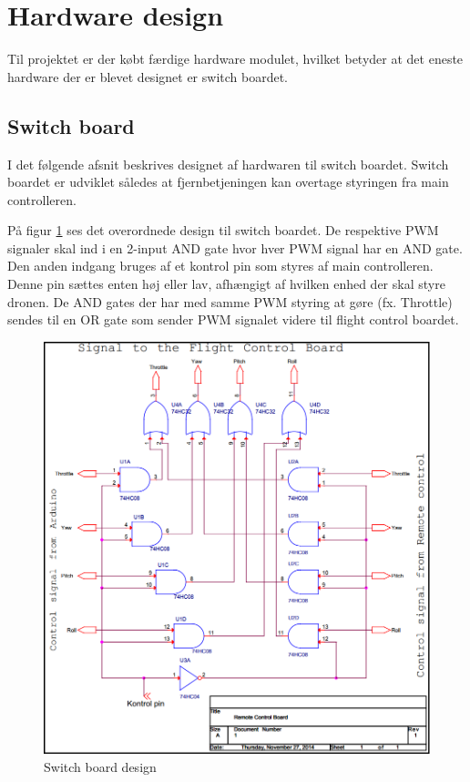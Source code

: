 \section{Hardware design}
Til projektet er der købt færdige hardware modulet, hvilket betyder at det eneste hardware der er blevet designet er switch boardet. 

\subsection{Switch board}
I det følgende afsnit beskrives designet af hardwaren til switch boardet. Switch boardet er udviklet således at fjernbetjeningen kan overtage styringen fra main controlleren.

På figur \ref{fig:switchboard_design} ses det overordnede design til switch boardet. 
De respektive PWM signaler skal ind i en 2-input AND gate hvor hver PWM signal har en AND gate. Den anden indgang bruges af et kontrol pin som styres af main controlleren. Denne pin sættes enten høj eller lav, afhængigt af hvilken enhed der skal styre dronen. 
De AND gates der har med samme PWM styring at gøre (fx. Throttle) sendes til en OR gate som sender PWM signalet videre til flight control boardet. 

\begin{figure}[H]
	\centering
	\includegraphics[width=1\textwidth]{Billeder/hardware/switch_board_diagram.png}
	\caption{Switch board design}
	\label{fig:switchboard_design}
\end{figure}
